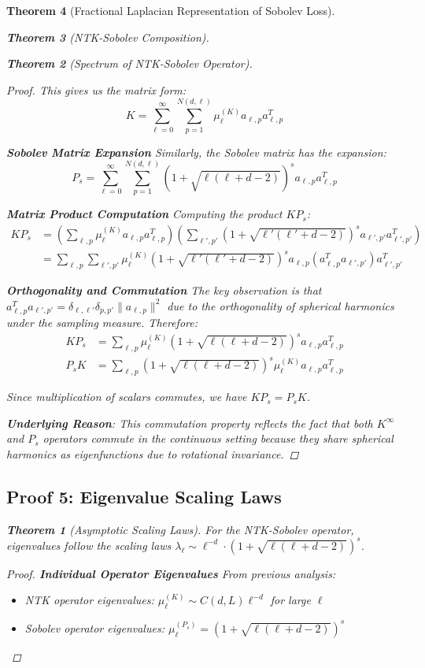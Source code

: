 \documentclass{article}
\newtheorem{theorem}{Theorem}[section]
\begin{document}
\begin{theorem}[Fractional Laplacian Representation of Sobolev Loss]
\begin{theorem}[NTK-Sobolev Composition]
\begin{theorem}[Spectrum of NTK-Sobolev Operator]
\begin{proof}
This gives us the matrix form:
\[ K = \sum_{\ell=0}^{\infty} \sum_{p=1}^{N(d,\ell)} \mu_\ell^{(K)} a_{\ell,p} a_{\ell,p}^T \]

\textbf{Sobolev Matrix Expansion}
Similarly, the Sobolev matrix has the expansion:
\[ P_s = \sum_{\ell=0}^{\infty} \sum_{p=1}^{N(d,\ell)} (1 + \sqrt{\ell(\ell + d - 2)})^s a_{\ell,p} a_{\ell,p}^T \]

\textbf{Matrix Product Computation}
Computing the product $KP_s$:
\begin{align}
KP_s &= \left(\sum_{\ell,p} \mu_\ell^{(K)} a_{\ell,p} a_{\ell,p}^T\right) \left(\sum_{\ell',p'} (1 + \sqrt{\ell'(\ell' + d - 2)})^s a_{\ell',p'} a_{\ell',p'}^T\right) \\
&= \sum_{\ell,p} \sum_{\ell',p'} \mu_\ell^{(K)} (1 + \sqrt{\ell'(\ell' + d - 2)})^s a_{\ell,p} (a_{\ell,p}^T a_{\ell',p'}) a_{\ell',p'}^T
\end{align}

\textbf{Orthogonality and Commutation}
The key observation is that $a_{\ell,p}^T a_{\ell',p'} = \delta_{\ell,\ell'} \delta_{p,p'} \|a_{\ell,p}\|^2$ due to the orthogonality of spherical harmonics under the sampling measure. Therefore:
\begin{align}
KP_s &= \sum_{\ell,p} \mu_\ell^{(K)} (1 + \sqrt{\ell(\ell + d - 2)})^s a_{\ell,p} a_{\ell,p}^T \\
P_sK &= \sum_{\ell,p} (1 + \sqrt{\ell(\ell + d - 2)})^s \mu_\ell^{(K)} a_{\ell,p} a_{\ell,p}^T
\end{align}

Since multiplication of scalars commutes, we have $KP_s = P_sK$.

\textbf{Underlying Reason}: This commutation property reflects the fact that both $K^{\infty}$ and $P_s$ operators commute in the continuous setting because they share spherical harmonics as eigenfunctions due to rotational invariance.
\end{proof}

\subsection{Proof 5: Eigenvalue Scaling Laws}

\begin{theorem}[Asymptotic Scaling Laws]
For the NTK-Sobolev operator, eigenvalues follow the scaling laws $\lambda_\ell \sim \ell^{-d} \cdot (1 + \sqrt{\ell(\ell + d - 2)})^s$.
\end{theorem}

\begin{proof}
\textbf{Individual Operator Eigenvalues}
From previous analysis:
\begin{itemize}
\item NTK operator eigenvalues: $\mu_\ell^{(K)} \sim C(d, L) \ell^{-d}$ for large $\ell$
\item Sobolev operator eigenvalues: $\mu_\ell^{(P_s)} = (1 + \sqrt{\ell(\ell + d - 2)})^s$
\end{itemize}


\end{proof}
\end{theorem}
\end{theorem}
\end{theorem}
\end{document}

